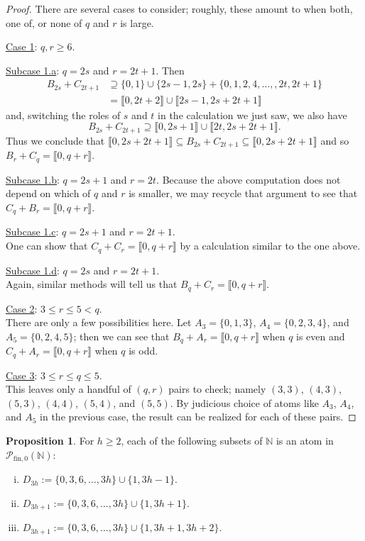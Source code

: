 \documentclass{report}
\newcommand{\NN}{\mathbb{N}}
\renewcommand{\P}{\mathcal{P}}
\newcommand{\llb}{\llbracket}
\newcommand{\rrb}{\rrbracket}
\newcommand{\fin}{\textrm{fin}}
\renewcommand{\:}{\text{:}}
\newcommand{\PN}{{\P_{\fin,0}(\NN)}}
\theoremstyle{definition}
\newtheorem{prop}[defn]{Proposition}
\begin{document}
\begin{proof}
There are several cases to consider; roughly, these amount to when both, one of, or none of $q$ and $r$ is large.

\underline{Case 1}: $q,r \ge 6$. 

\underline{Subcase 1.a}: $q = 2s$ and $r = 2t+1$.
Then 
\begin{align*}
B_{2s} + C_{2t+1} 
&\supseteq \{0,1\}\cup\{2s-1,2s\} + \{0,1,2,4,\dots, ,2t,2t+1\} \\
&= \llb 0, 2t+2 \rrb \cup \llb 2s-1,2s+2t+1 \rrb
\end{align*}
and, switching the roles of $s$ and $t$ in the calculation we just saw, we also have 
\[B_{2s}+C_{2t+1} \supseteq \llb 0,2s+1 \rrb \cup \llb 2t,2s+2t+1 \rrb.\]
Thus we conclude that $\llb 0,2s+2t+1 \rrb \subseteq B_{2s}+C_{2t+1} \subseteq \llb 0,2s+2t+1 \rrb$ and so $B_r + C_q = \llb 0,q+r \rrb$.

\underline{Subcase 1.b}: $q = 2s+1$ and $r = 2t$.
Because the above computation does not depend on which of $q$ and $r$ is smaller, we may recycle that argument to see that $C_q + B_r = \llb 0,q+r \rrb$.

\underline{Subcase 1.c}: $q = 2s+1$ and $r = 2t+1$.\\
One can show that $C_q + C_r = \llb 0,q+r \rrb$ by a calculation similar to the one above.

\underline{Subcase 1.d}: $q = 2s$ and $r = 2t+1$. \\
Again, similar methods will tell us that $B_q + C_r = \llb 0,q+r \rrb$.

\underline{Case 2}: $3 \le r \le 5 < q$.\\
There are only a few possibilities here.
Let $A_3 = \{0,1,3\}$, $A_4 = \{0,2,3,4\}$, and $A_5 = \{0,2,4,5\}$; then we can see that $B_q +A_r = \llb 0,q+r \rrb$ when $q$ is even and $C_q + A_r = \llb 0,q+r \rrb$ when $q$ is odd.

\underline{Case 3}: $3\le r\le q \le 5$.\\
This leaves only a handful of $(q,r)$ pairs to check; namely $(3,3)$, $(4,3)$, $(5,3)$, $(4,4)$, $(5,4)$, and $(5,5)$.
By judicious choice of atoms like $A_3$, $A_4$, and $A_5$ in the previous case, the result can be realized for each of these pairs.
\end{proof}

\begin{prop} \label{prop:3-congruence atoms}
For $h\ge 2$, each of the following subsets of $\NN$ is an atom in $\PN$:
\begin{enumerate}[(i)]
\item $D_{3h} := \{0,3,6,\dots, 3h\} \cup \{ 1, 3h-1 \}$.
\item $D_{3h+1} := \{0,3,6,\dots, 3h\} \cup \{ 1, 3h+1 \}$.
\item $D_{3h+1} := \{0,3,6,\dots, 3h\} \cup \{ 1, 3h+1, 3h+2 \}$.
\end{enumerate}
\end{prop}
\end{document}
